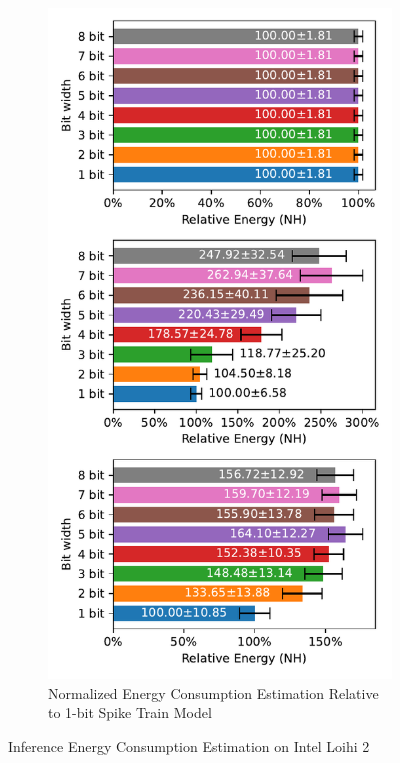         \begin{figure}[H]
            \centering
            \ContinuedFloat
            \begin{subfigure}[H]{0.7\textwidth}
                \centering
                \includegraphics[width=\textwidth]{../standard/NMNIST/plots/nmnist_test_relative_energy_nh.pdf}
                \caption{Normalized Energy Consumption Estimation Relative to 1-bit Spike Train Model}
            \end{subfigure}
            \caption{Inference Energy Consumption Estimation on Intel Loihi 2}
        \end{figure}


